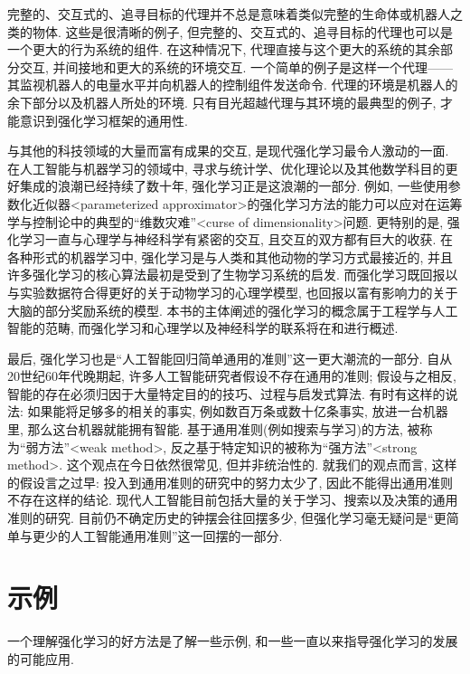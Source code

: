 完整的、交互式的、追寻目标的代理并不总是意味着类似完整的生命体或机器人之类的物体. 这些是很清晰的例子, 但完整的、交互式的、追寻目标的代理也可以是一个更大的行为系统的组件. 在这种情况下, 代理直接与这个更大的系统的其余部分交互, 并间接地和更大的系统的环境交互. 一个简单的例子是这样一个代理——其监视机器人的电量水平并向机器人的控制组件发送命令. 代理的环境是机器人的余下部分以及机器人所处的环境. 只有目光超越代理与其环境的最典型的例子, 才能意识到强化学习框架的通用性. 

与其他的科技领域的大量而富有成果的交互, 是现代强化学习最令人激动的一面. 在人工智能与机器学习的领域中, 寻求与统计学、优化理论以及其他数学科目的更好集成的浪潮已经持续了数十年, 强化学习正是这浪潮的一部分. 例如, 一些使用参数化近似器<parameterized approximator>的强化学习方法的能力可以应对在运筹学与控制论中的典型的``维数灾难''<curse of dimensionality>问题. 更特别的是, 强化学习一直与心理学与神经科学有紧密的交互, 且交互的双方都有巨大的收获. 在各种形式的机器学习中, 强化学习是与人类和其他动物的学习方式最接近的, 并且许多强化学习的核心算法最初是受到了生物学习系统的启发. 而强化学习既回报以与实验数据符合得更好的关于动物学习的心理学模型, 也回报以富有影响力的关于大脑的部分奖励系统的模型. 本书的主体阐述的强化学习的概念属于工程学与人工智能的范畴, 而强化学习和心理学以及神经科学的联系将在和进行概述.

最后, 强化学习也是``人工智能回归简单通用的准则''这一更大潮流的一部分. 自从20世纪60年代晚期起, 许多人工智能研究者假设不存在通用的准则; 假设与之相反, 智能的存在必须归因于大量特定目的的技巧、过程与启发式算法. 有时有这样的说法: 如果能将足够多的相关的事实, 例如数百万条或数十亿条事实, 放进一台机器里, 那么这台机器就能拥有智能. 基于通用准则(例如搜索与学习)的方法, 被称为``弱方法''<weak method>, 反之基于特定知识的被称为``强方法''<strong method>. 这个观点在今日依然很常见, 但并非统治性的. 就我们的观点而言, 这样的假设言之过早: 投入到通用准则的研究中的努力太少了, 因此不能得出通用准则不存在这样的结论. 现代人工智能目前包括大量的关于学习、搜索以及决策的通用准则的研究. 目前仍不确定历史的钟摆会往回摆多少, 但强化学习毫无疑问是``更简单与更少的人工智能通用准则''这一回摆的一部分.

\section{示例}\label{sec:1.2}

一个理解强化学习的好方法是了解一些示例, 和一些一直以来指导强化学习的发展的可能应用.


